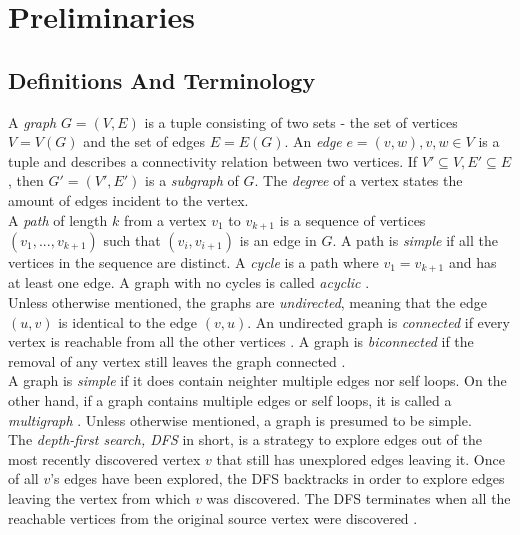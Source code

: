 \section{Preliminaries}\label{section:preliminaries}

\subsection{Definitions And Terminology}
A \emph{graph} $G=(V,E)$ is a tuple consisting of two sets - the set of vertices $V=V(G)$ and the set of edges $E=E(G)$. An \emph{edge} $e = (v,w), v,w \in V$ is a tuple and describes a connectivity relation between two vertices.
If $V'\subseteq V, E'\subseteq E$, then $G' = (V',E')$ is a \emph{subgraph} of $G$.
The \emph{degree} of a vertex states the amount of edges incident to the vertex.\\
A \emph{path} of length $k$ from a vertex $v_1$ to $v_{k+1}$ is a sequence of vertices $(v_1,...,v_{k+1})$ such that $(v_i,v_{i+1})$ is an edge in $G$.  A path is \emph{simple} if all the vertices in the sequence are distinct. A \emph{cycle} is a path where $v_1 = v_{k+1}$ and has at least one edge. A graph with no cycles is called \emph{acyclic} \cite[P. 1170]{DBLP:cormen_intro_to_algorithms}.\\
Unless otherwise mentioned, the graphs are \emph{undirected}, meaning that the edge $(u,v)$ is identical to the edge $(v,u)$.
An undirected graph is \emph{connected} if every vertex is reachable from all the other vertices \cite[P. 1170]{DBLP:cormen_intro_to_algorithms}.
A graph is \emph{biconnected} if the removal of any vertex still leaves the graph connected \cite[P. 224]{Duncan_planar_polyline_drawings}.\\
A graph is \emph{simple} if it does contain neighter multiple edges nor self loops. On the other hand, if a graph contains multiple edges or self loops, it is called a \emph{multigraph} \cite[P. 1172]{DBLP:cormen_intro_to_algorithms}. Unless otherwise mentioned, a graph is presumed to be simple.\\
The \emph{depth-first search, DFS} in short, is a strategy to explore edges out of the most recently discovered vertex $v$ that still has unexplored edges leaving it. Once of all $v$'s edges have been explored, the DFS backtracks in order to explore edges leaving the vertex from which $v$ was discovered. The DFS terminates when all the reachable vertices from the original source vertex were discovered \cite[P.603]{DBLP:cormen_intro_to_algorithms}.

